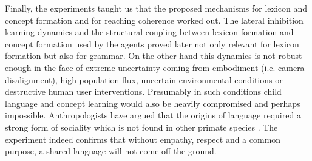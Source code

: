 Finally, the experiments taught us that the proposed mechanisms for lexicon and concept formation and for reaching 
coherence worked out. The lateral inhibition learning dynamics and the structural coupling 
between lexicon formation and concept formation used by the agents proved later not only relevant for 
lexicon formation but also for grammar. On the other hand this dynamics is not robust enough in the face 
of extreme uncertainty coming from embodiment (i.e. camera disalignment), high population flux, uncertain 
environmental conditions or destructive human user 
interventions. Presumably in such conditions child language and concept learning would also be heavily 
compromised and perhaps impossible. Anthropologists have argued that the origins of language required a strong  
form of sociality which is not found in other primate species \citep{Knight:2014}. 
The experiment indeed confirms that without empathy, respect and a common purpose, a shared language will not come off the ground. 


